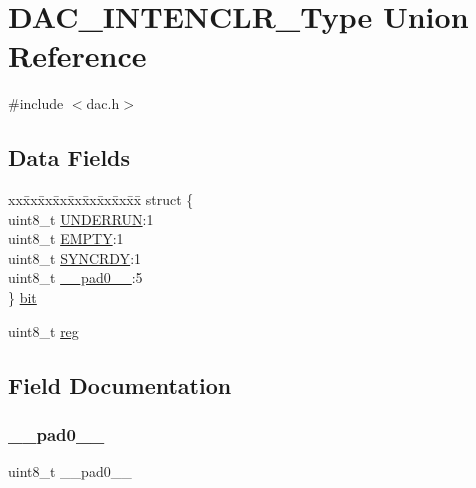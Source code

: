 \hypertarget{union_d_a_c___i_n_t_e_n_c_l_r___type}{}\section{D\+A\+C\+\_\+\+I\+N\+T\+E\+N\+C\+L\+R\+\_\+\+Type Union Reference}
\label{union_d_a_c___i_n_t_e_n_c_l_r___type}


{\ttfamily \#include $<$dac.\+h$>$}

\subsection*{Data Fields}
\begin{DoxyCompactItemize}
\item 
\begin{tabbing}
xx\=xx\=xx\=xx\=xx\=xx\=xx\=xx\=xx\=\kill
struct \{\\
\>uint8\_t \mbox{\hyperlink{union_d_a_c___i_n_t_e_n_c_l_r___type_a4a600e4515233e5fe148ced76d012923}{UNDERRUN}}:1\\
\>uint8\_t \mbox{\hyperlink{union_d_a_c___i_n_t_e_n_c_l_r___type_aef6972f7f1f375b8bfde6f2bef407515}{EMPTY}}:1\\
\>uint8\_t \mbox{\hyperlink{union_d_a_c___i_n_t_e_n_c_l_r___type_aece75e176e4fd55bf68937f1b56bde63}{SYNCRDY}}:1\\
\>uint8\_t \mbox{\hyperlink{union_d_a_c___i_n_t_e_n_c_l_r___type_a8b4eebe79ded0459acec2f4950102ba3}{\_\_pad0\_\_}}:5\\
\} \mbox{\hyperlink{union_d_a_c___i_n_t_e_n_c_l_r___type_a8f9e59f81be4eec719becd31c7307bea}{bit}}\\

\end{tabbing}\item 
uint8\+\_\+t \mbox{\hyperlink{union_d_a_c___i_n_t_e_n_c_l_r___type_a9428adc9af4653a2050e2536b55dec8d}{reg}}
\end{DoxyCompactItemize}


\subsection{Field Documentation}
\mbox{\label{union_d_a_c___i_n_t_e_n_c_l_r___type_a8b4eebe79ded0459acec2f4950102ba3}} 
\subsubsection{\texorpdfstring{\_\_pad0\_\_}{\_\_pad0\_\_}}
{\footnotesize\ttfamily uint8\+\_\+t \+\_\+\+\_\+pad0\+\_\+\+\_\+}

